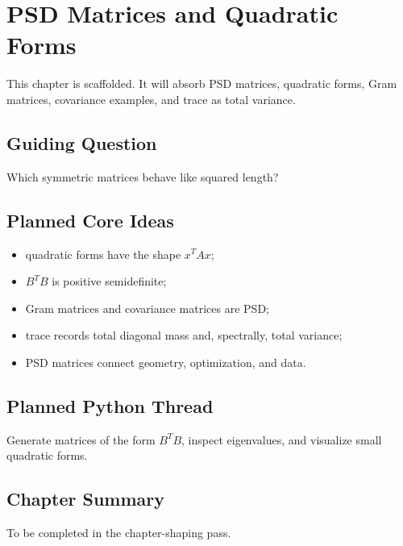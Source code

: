 \chapter{PSD Matrices and Quadratic Forms}
\label{ch:psd-quadratic-forms}

\begin{draftbox}
This chapter is scaffolded. It will absorb PSD matrices, quadratic forms,
Gram matrices, covariance examples, and trace as total variance.
\end{draftbox}

\section{Guiding Question}

Which symmetric matrices behave like squared length?

\section{Planned Core Ideas}

\begin{itemize}
  \item quadratic forms have the shape $x^TAx$;
  \item $B^TB$ is positive semidefinite;
  \item Gram matrices and covariance matrices are PSD;
  \item trace records total diagonal mass and, spectrally, total variance;
  \item PSD matrices connect geometry, optimization, and data.
\end{itemize}

\section{Planned Python Thread}

Generate matrices of the form $B^TB$, inspect eigenvalues, and visualize small
quadratic forms.

\section*{Chapter Summary}

To be completed in the chapter-shaping pass.


